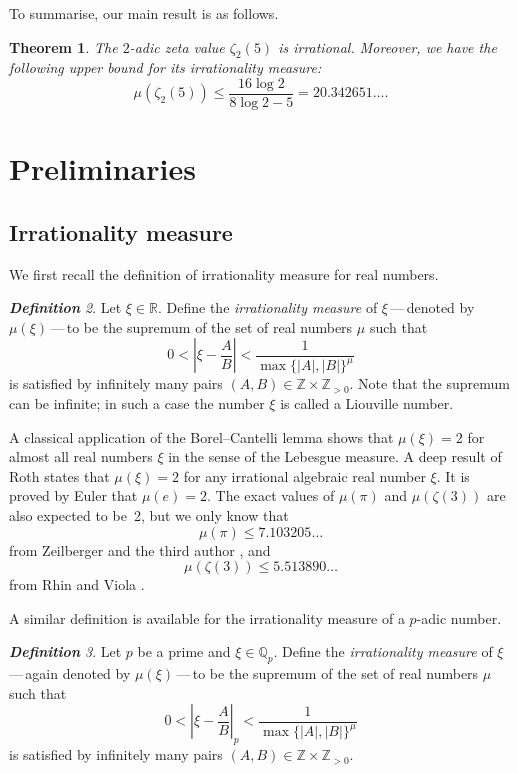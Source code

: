\documentclass[12pt]{article}
\let\le\leqslant
\newtheorem{theorem}{Theorem}[section]
\theoremstyle{remark}
\newtheorem{definition}[theorem]{\bf Definition}
\numberwithin{equation}{section}
\begin{document}
To summarise, our main result is as follows.

\begin{theorem}\label{main}
The $2$-adic zeta value $\zeta_2(5)$ is irrational. Moreover, we have the following upper bound for its irrationality measure: 
\[  
\mu(\zeta_2(5)) \le \frac{16\log 2}{8\log 2 - 5} = 20.342651\dotsc. 
\]
\end{theorem}

\section{Preliminaries}

\subsection{Irrationality measure}

We first recall the definition of irrationality measure for real numbers.

\begin{definition}
Let $\xi \in \mathbb{R}$. 
Define the \emph{irrationality measure} of $\xi$\,---\,denoted by $\mu(\xi)$\,---\,to be the supremum of the set of real numbers $\mu$ such that 
\[
0< \left| \xi - \frac{A}{B} \right| < \frac{1}{\max\{ |A|, |B| \}^{\mu}}
\]
is satisfied by infinitely many pairs $(A,B) \in \mathbb{Z} \times \mathbb{Z}_{>0}$. 
Note that the supremum can be infinite; in such a case the number $\xi$ is called a Liouville number.
\end{definition}

A classical application of the Borel--Cantelli lemma shows that $\mu(\xi) = 2$ for almost all real numbers $\xi$ in the sense of the Lebesgue measure. 
A deep result of Roth \cite{Rot1955} states that $\mu(\xi)=2$ for any irrational algebraic real number $\xi$. 
It is proved by Euler that $\mu(e)=2$. 
The exact values of $\mu(\pi)$ and $\mu(\zeta(3))$ are also expected to be~2, but we only know that 
\[ 
\mu(\pi) \le 7.103205\dots
\]
from Zeilberger and the third author \cite{ZZ2020}, and
\[
\mu(\zeta(3)) \le 5.513890\dots
\]
from Rhin and Viola \cite{RV2001}.

A similar definition is available for the irrationality measure of a $p$-adic number.

\begin{definition}
Let $p$ be a prime and $\xi \in \mathbb{Q}_p$. 
Define the \emph{irrationality measure} of $\xi$\,---\,again denoted by $\mu(\xi)$\,---\,to be the supremum of the set of real numbers $\mu$ such that 
\[
0< \left| \xi - \frac{A}{B} \right|_p < \frac{1}{\max\{ |A|, |B| \}^{\mu}}
\]
is satisfied by infinitely many pairs $(A,B) \in \mathbb{Z} \times \mathbb{Z}_{>0}$.
\end{definition}
\end{document}
